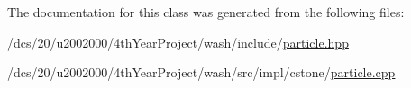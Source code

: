 The documentation for this class was generated from the following files\+:\begin{DoxyCompactItemize}
\item 
/dcs/20/u2002000/4th\+Year\+Project/wash/include/\mbox{\hyperlink{particle_8hpp}{particle.\+hpp}}\item 
/dcs/20/u2002000/4th\+Year\+Project/wash/src/impl/cstone/\mbox{\hyperlink{cstone_2particle_8cpp}{particle.\+cpp}}\end{DoxyCompactItemize}

